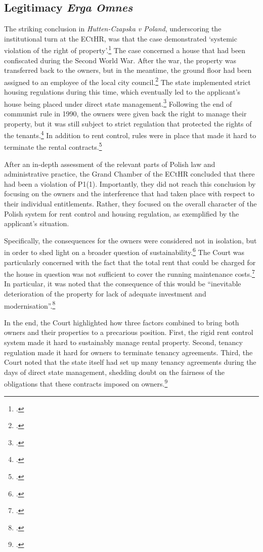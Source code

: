 \subsection{Legitimacy {\it Erga Omnes}}\label{sec:3:4:1}

The striking conclusion in {\it Hutten-Czapska v Poland}, underscoring the institutional turn at the ECtHR, was that the case demonstrated `systemic violation of the right of property'.\footcite[239]{hutten06} The case concerned a house that had been confiscated during the Second World War. After the war, the property was transferred back to the owners, but in the meantime, the ground floor had been assigned to an employee of the local city council.\footcite[20-31]{hutten06} The state implemented strict housing regulations during this time, which eventually led to the applicant's house being placed under direct state management.\footcite[20-31]{hutten06} Following the end of communist rule in 1990, the owners were given back the right to manage their property, but it was still subject to strict regulation that protected the rights of the tenants.\footcite[31-53]{hutten06} In addition to rent control, rules were in place that made it hard to terminate the rental contracts.\footcite[20-53]{hutten06} 

After an in-depth assessment of the relevant parts of Polish law and administrative practice, the Grand Chamber of the ECtHR concluded that there had been a violation of P1(1). Importantly, they did not reach this conclusion by focusing on the owners and the interference that had taken place with respect to their individual entitlements. Rather, they focused on the overall character of the Polish system for rent control and housing regulation, as exemplified by the applicant's situation.

Specifically, the consequences for the owners were considered not in isolation, but in order to shed light on a broader question of sustainability.\footcite[60-61]{hutten06} The Court was particularly concerned with the fact that the total rent that could be charged for the house in question was not sufficient to cover the running maintenance costs.\footcite[224]{hutten06} In particular, it was noted that the consequence of this would be ``inevitable deterioration of the property for lack of adequate investment and modernisation''.\footnote{\cite[224]{hutten06}.}

In the end, the Court highlighted how three factors combined to bring both owners and their properties  to a precarious position. First, the rigid rent control system made it hard to sustainably manage rental property. Second, tenancy regulation made it hard for owners to terminate tenancy agreements. Third, the Court noted that the state itself had set up many tenancy agreements during the days of direct state management, shedding doubt on the fairness of the obligations that these contracts imposed on owners.\footcite[224-225]{hutten06} 

